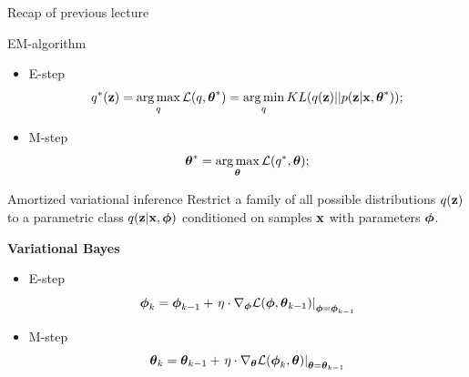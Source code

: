 

\begin{frame}
\titlepage
\end{frame}
\begin{frame}{Recap of previous lecture}
	\begin{block}{EM-algorithm}
	\begin{itemize}
		\item E-step
		\[
			q^*(\mathbf{z}) = \operatorname*{arg\,max}_q \mathcal{L} (q, \boldsymbol{\theta}^*)
			= \operatorname*{arg\,min}_q KL(q(\mathbf{z}) || p(\mathbf{z} | \mathbf{x}, \boldsymbol{\theta}^*));
		\]
		\item M-step
		\[
			\boldsymbol{\theta}^* = \operatorname*{arg\,max}_{\boldsymbol{\theta}} \mathcal{L} (q^*, \boldsymbol{\theta});
		\]
	\end{itemize}
	\vspace{-0.3cm}
	\end{block}
	\begin{block}{Amortized variational inference}
	Restrict a family of all possible distributions $q(\mathbf{z})$ to a parametric class $q(\mathbf{z}|\mathbf{x}, \boldsymbol{\phi})$ conditioned on samples $\mathbf{x}$ with parameters $\boldsymbol{\phi}$.
	\end{block}
	
	\textbf{Variational Bayes}
	\begin{itemize}
		\item E-step
		\[
		\boldsymbol{\phi}_k = \boldsymbol{\phi}_{k-1} + \left.\eta \cdot \nabla_{\boldsymbol{\phi}} \mathcal{L}(\boldsymbol{\phi}, \boldsymbol{\theta}_{k-1})\right|_{\boldsymbol{\phi}=\boldsymbol{\phi}_{k-1}}
		\]
		\item M-step
		\[
		\boldsymbol{\theta}_k = \boldsymbol{\theta}_{k-1} + \left.\eta \cdot \nabla_{\boldsymbol{\theta}} \mathcal{L}(\boldsymbol{\phi}_k, \boldsymbol{\theta})\right|_{\boldsymbol{\theta}=\boldsymbol{\theta}_{k-1}}
		\]
	\end{itemize}
\end{frame}
